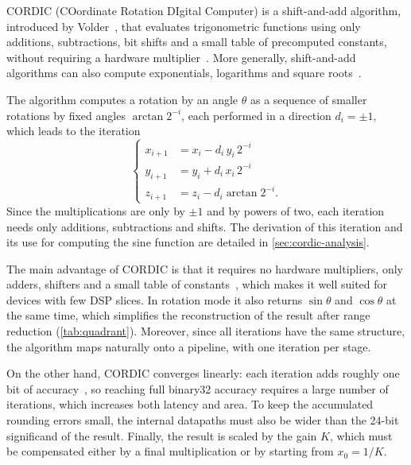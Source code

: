 CORDIC (COordinate Rotation DIgital Computer) is a shift-and-add algorithm,
introduced by Volder~\cite{volder1959}, that evaluates trigonometric functions
using only additions, subtractions, bit shifts and a small table of precomputed
constants, without requiring a hardware multiplier~\cite{muller2020}. More
generally, shift-and-add algorithms can also compute exponentials, logarithms
and square roots~\cite{muller2020}.

The algorithm computes a rotation by an angle $\theta$ as a sequence of smaller
rotations by fixed angles $\arctan 2^{-i}$, each performed in a direction
$d_{i} = \pm 1$, which leads to the iteration~\cite{muller2020}
\begin{equation}
  \left\lbrace
  \begin{aligned}
    x_{i+1} &= x_{i} - d_{i}\, y_{i}\, 2^{-i} \\
    y_{i+1} &= y_{i} + d_{i}\, x_{i}\, 2^{-i} \\
    z_{i+1} &= z_{i} - d_{i} \arctan 2^{-i}.
  \end{aligned}
  \right.
  \label{eq:cordic}
\end{equation}
Since the multiplications are only by $\pm 1$ and by powers of two, each
iteration needs only additions, subtractions and shifts. The derivation of
this iteration and its use for computing the sine function are detailed in
\cref{sec:cordic-analysis}.

The main advantage of CORDIC is that it requires no hardware multipliers, only adders, shifters and a small table of constants~\cite{muller2020}, which makes it well suited for devices with few DSP slices. In rotation mode it also returns $\sin\theta$ and $\cos\theta$ at the same time, which simplifies the reconstruction of the result after range reduction (\cref{tab:quadrant}). Moreover, since all iterations have the same structure, the algorithm maps naturally onto a pipeline, with one iteration per stage.

On the other hand, CORDIC converges linearly: each iteration adds roughly one bit of accuracy~\cite{muller2020}, so reaching full binary32 accuracy requires a large number of iterations, which increases both latency and area.
To keep the accumulated rounding errors small, the internal datapaths must also be wider than the 24-bit significand of the result. Finally, the result is scaled by the gain $K$, which must be compensated either by a final multiplication or by starting from $x_{0} = 1/K$.



